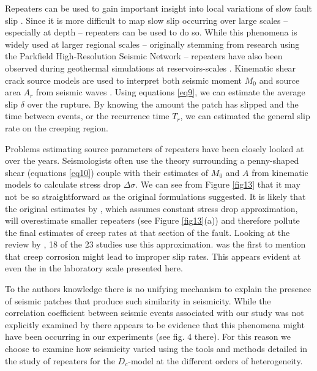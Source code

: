 \documentclass[preprint,1p, 10pt,authoryear]{elsarticle}
\begin{document}
Repeaters can be used to gain important insight into local variations of slow fault slip \citep[]{Nadeau1994, Kato2012, Igarashi2003}. Since it is more difficult to map slow slip occurring over large scales -- especially at depth -- repeaters can be used to do so. While this phenomena is widely used at larger regional scales -- originally stemming from research using the Parkfield High-Resolution Seismic Network -- repeaters have also been observed during geothermal simulations at reservoirs-scales \citep{Lengline2014, Cauchie2020}. Kinematic shear crack source models are used to interpret both seismic moment $M_{0}$ and source area $A_{r}$ from seismic waves \cite[]{Brune1970, Madariaga1976, Hanks1979}.  Using equations \eqref{eq9}, we can estimate the average slip $\delta$ over the rupture. By knowing the amount the patch has slipped and the time between events, or the recurrence time $T_{r}$, we can estimated the general slip rate on the creeping region.

Problems estimating source parameters of repeaters have been closely looked at over the years. Seismologists often use the theory surrounding a penny-shaped shear (equations \eqref{eq10}) couple with their estimates of $M_{0}$ and $A$ from kinematic models to calculate stress drop $\Delta\sigma$. We can see from Figure \ref{fig13} that it may not be so straightforward as the original formulations suggested. It is likely that the original estimates by \citet{Nadeau1998}, which assumes constant stress drop approximation, will overestimate smaller repeaters (see Figure \ref{fig13}(a)) and therefore pollute the final estimates of creep rates at that section of the fault.  Looking at the review by \citet{Uchida2019}, 18 of the 23 studies use this approximation. \citet{Beeler2001} was the first to mention that creep corrosion might lead to improper slip rates. This appears evident at even the in the laboratory scale presented here.

To the authors knowledge there is no unifying mechanism to explain the presence of seismic patches that produce such similarity in seismicity.  While the correlation coefficient between seismic events associated with our study was not explicitly examined by \citet{Selvadurai2019} there appears to be evidence that this phenomena might have been occurring in our experiments (see fig. 4 there). For this reason we choose to examine how seismicity varied using the tools and methods detailed in the study of repeaters for the $D_{c}$-model at the different orders of heterogeneity. 
\end{document}
